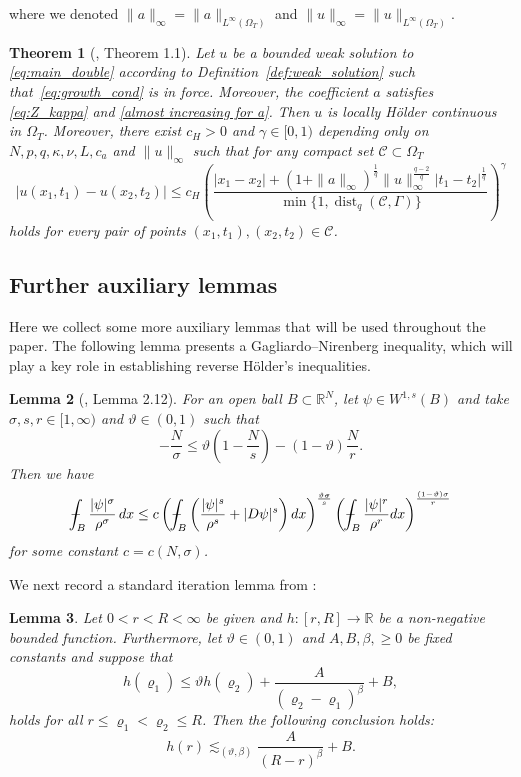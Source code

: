 \documentclass[notitlepage,11pt,reqno]{amsart}
\newtheorem{theorem}{Theorem}[section]
\newtheorem{lemma}[theorem]{Lemma}
\theoremstyle{definition}
\numberwithin{equation}{section}
\newcommand{\RR}{\mathds{R}}
\DeclareMathOperator*{\dist}{dist}
\def\Xint#1{\mathchoice
	{\XXint\displaystyle\textstyle{#1}}%
	{\XXint\textstyle\scriptstyle{#1}}%
	{\XXint\scriptstyle\scriptscriptstyle{#1}}%
	{\XXint\scriptscriptstyle\scriptscriptstyle{#1}}%
	\!\int}
\def\XXint#1#2#3{{\setbox0=\hbox{$#1{#2#3}{\int}$}
		\vcenter{\hbox{$#2#3$}}\kern-.50\wd0}}
\def\Xint#1{\mathchoice
	{\XXint\displaystyle\textstyle{#1}}%
	{\XXint\textstyle\scriptstyle{#1}}%
	{\XXint\scriptstyle\scriptscriptstyle{#1}}%
	{\XXint\scriptscriptstyle\scriptscriptstyle{#1}}%
	\!\int}
\def\XXint#1#2#3{{\setbox0=\hbox{$#1{#2#3}{\int}$}
		\vcenter{\hbox{$#2#3$}}\kern-.50\wd0}}
\def\dashint{\Xint-}
\begin{document}
where we denoted $\|a\|_{\infty}=\|a \|_{L^\infty(\Omega_T)}$ and $\|u\|_{\infty}=\|u \|_{L^\infty(\Omega_T)}$.

\begin{theorem}[\cite{Kim2025holder}, Theorem 1.1]\label{holder cts thm}
Let $u$ be a bounded weak solution to \eqref{eq:main_double} according to Definition~\ref{def:weak_solution} such that~\eqref{eq:growth_cond} is in force. Moreover, the coefficient $a$ satisfies \eqref{eq:Z_kappa} and \eqref{almost increasing for a}. Then $u$ is locally H\"older continuous in $\Omega_T$. Moreover, there exist $c_H > 0$ and $\gamma \in[0,1)$ depending only on $N,p,q,\kappa, \nu, L, c_a$ and $\|u\|_\infty$ such that for any compact set $\mathcal{C} \subset \Omega_T$
     $$
     |u(x_1,t_1)-u(x_2,t_2)|\le c_H\left(\frac{|x_1-x_2|+(1+\|a\|_\infty)^\frac{1}{q}\|u\|_{\infty}^{\frac{q-2}{q}}|t_1-t_2|^\frac{1}{q} }{\min\{1,\dist_q(\mathcal{C}, \Gamma ) \}}\right)^\gamma
     $$
     holds for every pair of points $(x_1,t_1),(x_2,t_2)\in \mathcal{C}$. 
\end{theorem}


\subsection{Further auxiliary lemmas} Here we collect some more auxiliary lemmas that will be used throughout the paper. The following lemma presents a Gagliardo–Nirenberg inequality, which will play a key role in establishing reverse H\"{o}lder's inequalities.
\begin{lemma}[\cite{Hasto_2021}, Lemma 2.12]\label{lem : lemma 2.1}
For an open ball $B\subset \RR^N$, let $\psi \in W^{1, s}(B)$ and take $\sigma, s, r \in[1, \infty)$ and $\vartheta \in(0,1)$ such that
    $$
    -\frac{N}{\sigma} \leq \vartheta\left(1-\frac{N}{s}\right)-(1-\vartheta) \frac{N}{r}.
    $$
    Then we have
    $$
    \dashint_{B} \frac{|\psi|^\sigma}{\rho^\sigma} \, d x \leq c\left(\dashint_{B}\left(\frac{|\psi|^s}{\rho^s}+|D\psi|^s\right) d x\right)^{\frac{\vartheta \sigma}{s}}\left(\dashint_{B} \frac{|\psi|^r}{\rho^r} d x\right)^{\frac{(1-\vartheta) \sigma}{r}}
    $$
    for some constant $c=c(N, \sigma)$.
\end{lemma}
We next record a standard iteration lemma from \cite[Lemma 1.1]{GG82}:
\begin{lemma}
	\label{iter_lemma}
	Let $0< r< R<\infty$ be given and $h : [r, R] \to \RR$ be a non-negative bounded function. Furthermore, let $\vartheta \in (0,1)$ and $A,B,\beta, \geq 0$ be fixed constants and 
	suppose that
	$$
	h(\varrho_1) \leq \vartheta h(\varrho_2) + \frac{A}{(\varrho_2-\varrho_1)^{\beta}} + B,
	$$
	holds for all $r \leq \varrho_1 < \varrho_2 \leq R$.
    Then the following conclusion holds:
	$$
	h(r) \lesssim_{(\vartheta,\beta)} \frac{A}{(R-r)^{\beta}} + B.
	$$
\end{lemma} 
\end{document}
